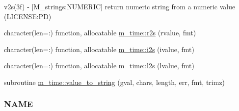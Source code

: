 \begin{DoxyCompactItemize}
\begin{DoxyCompactList}
v2s(3f) -\/ \mbox{[}M\+\_\+strings\+:N\+U\+M\+E\+R\+IC\mbox{]} return numeric string from a numeric value (L\+I\+C\+E\+N\+SE\+:PD) \end{DoxyCompactList}\item 
character(len=\+:) function, allocatable \mbox{\hyperlink{namespacem__time_a6fdd4bf34977b7a390ce93c75c2cc6d8}{m\+\_\+time\+::r2s}} (rvalue, fmt)
\item 
character(len=\+:) function, allocatable \mbox{\hyperlink{namespacem__time_a7ae85160c5039dad604fd05efad2445f}{m\+\_\+time\+::i2s}} (ivalue, fmt)
\item 
character(len=\+:) function, allocatable \mbox{\hyperlink{namespacem__time_a03e90459e69ffa353d1a6ce5765836fd}{m\+\_\+time\+::l2s}} (lvalue, fmt)
\item 
subroutine \mbox{\hyperlink{namespacem__time_a0dac2380784afe63e06862095d589c22}{m\+\_\+time\+::value\+\_\+to\+\_\+string}} (gval, chars, length, err, fmt, trimz)
\begin{DoxyCompactList}\small\item\em \subsubsection*{N\+A\+ME}


\end{DoxyCompactList}
\end{DoxyCompactItemize}
